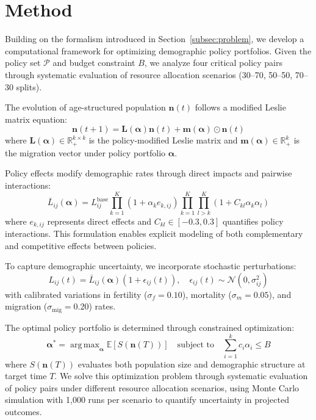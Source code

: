 \documentclass{article} %
\DeclareMathOperator*{\argmax}{arg\,max}
\begin{document}
\section{Method}
\label{sec:method}

Building on the formalism introduced in Section~\ref{subsec:problem}, we develop a computational framework for optimizing demographic policy portfolios. Given the policy set $\mathcal{P}$ and budget constraint $B$, we analyze four critical policy pairs through systematic evaluation of resource allocation scenarios (30--70, 50--50, 70--30 splits).

The evolution of age-structured population $\mathbf{n}(t)$ follows a modified Leslie matrix equation:
\begin{equation}
    \mathbf{n}(t+1) = \mathbf{L}(\boldsymbol{\alpha})\mathbf{n}(t) + \mathbf{m}(\boldsymbol{\alpha})\odot\mathbf{n}(t)
\end{equation}
where $\mathbf{L}(\boldsymbol{\alpha}) \in \mathbb{R}^{k \times k}_+$ is the policy-modified Leslie matrix and $\mathbf{m}(\boldsymbol{\alpha}) \in \mathbb{R}^k_+$ is the migration vector under policy portfolio $\boldsymbol{\alpha}$.

Policy effects modify demographic rates through direct impacts and pairwise interactions:
\begin{equation}
    \bar{L}_{ij}(\boldsymbol{\alpha}) = L_{ij}^{\text{base}} \prod_{k=1}^K (1 + \alpha_k e_{k,ij}) \prod_{k=1}^K \prod_{l>k}^K (1 + C_{kl}\alpha_k\alpha_l)
\end{equation}
where $e_{k,ij}$ represents direct effects and $C_{kl} \in [-0.3, 0.3]$ quantifies policy interactions. This formulation enables explicit modeling of both complementary and competitive effects between policies.

To capture demographic uncertainty, we incorporate stochastic perturbations:
\begin{equation}
    L_{ij}(t) = \bar{L}_{ij}(\boldsymbol{\alpha})(1 + \epsilon_{ij}(t)), \quad \epsilon_{ij}(t) \sim \mathcal{N}(0, \sigma_{ij}^2)
\end{equation}
with calibrated variations in fertility ($\sigma_f = 0.10$), mortality ($\sigma_m = 0.05$), and migration ($\sigma_{\text{mig}} = 0.20$) rates.

The optimal policy portfolio is determined through constrained optimization:
\begin{equation}
    \boldsymbol{\alpha}^* = \argmax_{\boldsymbol{\alpha}} \mathbb{E}[S(\mathbf{n}(T))] \quad \text{subject to} \quad \sum_{i=1}^k c_i\alpha_i \leq B
\end{equation}
where $S(\mathbf{n}(T))$ evaluates both population size and demographic structure at target time $T$. We solve this optimization problem through systematic evaluation of policy pairs under different resource allocation scenarios, using Monte Carlo simulation with 1,000 runs per scenario to quantify uncertainty in projected outcomes.
\end{document}
